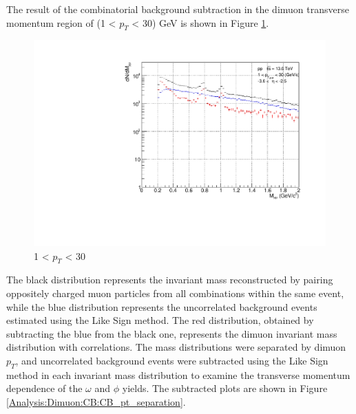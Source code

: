                 The result of the combinatorial background subtraction in the dimuon transverse momentum region of (1 < $p_T$ < 30) GeV is shown in Figure \ref{All_pt_CB}.
                \begin{figure}[H]
                    \centering
                    \includegraphics[keepaspectratio, scale=0.5]{fig/3_4_1_CB_pt_1to30.pdf}
                    \caption{1 < $p_{T}$ < 30}
                    \label{All_pt_CB}
                \end{figure}
                The black distribution represents the invariant mass reconstructed by pairing oppositely charged muon particles from all combinations within the same event, while the blue distribution represents the uncorrelated background events estimated using the Like Sign method. The red distribution, obtained by subtracting the blue from the black one, represents the dimuon invariant mass distribution with correlations.
                The mass distributions were separated by dimuon $p_T$, and uncorrelated background events were subtracted using the Like Sign method in each invariant mass distribution to examine the transverse momentum dependence of the $\omega$ and $\phi$ yields. The subtracted plots are shown in Figure \ref{Analysis:Dimuon:CB:CB_pt_separation}.

